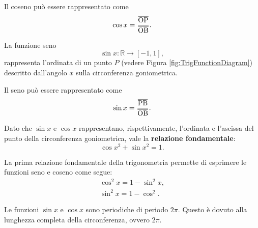 \begin{proposition}
    Il coseno può essere rappresentato come
    \begin{equation*}
        \cos x=\frac{\overline{\rm OP}}{\overline{\rm OB}}.
    \end{equation*}
\end{proposition}

\begin{definition}[Seno]
    La funzione seno
    \begin{equation*}
        \sin x\colon \mathbb R\rightarrow[-1,1],
    \end{equation*}
    rappresenta l'\gls{ordinata} di un punto $P$ (vedere Figura \ref{fig:TrigFunctionDiagram}) descritto dall'angolo $x$ sulla circonferenza goniometrica.
\end{definition}

\begin{proposition}
    Il seno può essere rappresentato come
    \begin{equation*}
        \sin x=\frac{\overline{\rm PB}}{\overline{\rm OB}}.
    \end{equation*}
\end{proposition}

\begin{property}\label{def:prima_relazione_fondamentale_goniometria}
    Dato che $\sin x$ e $\cos x$ rappresentano, rispettivamente, l'ordinata e l'ascissa del punto della circonferenza goniometrica, vale la \textbf{relazione fondamentale}:
    \begin{equation}
        \cos{x}^2+\sin{x}^2 = 1.
    \end{equation}
\end{property}

\begin{definition}
    La prima relazione fondamentale della trigonometria permette di esprimere le funzioni seno e coseno come segue:
    \begin{equation}\label{eq:prima_relazione_fondamentale_goniometria}
        \begin{matrix}
            \cos^2x=1-\sin^2x,\\
            \sin^2x=1-\cos^2.
        \end{matrix}
    \end{equation}
\end{definition}

\begin{property}
    Le funzioni $\sin x$ e $\cos x$ sono periodiche di periodo $2\pi$. Questo è dovuto alla lunghezza completa della circonferenza, ovvero $2\pi$.
\end{property}

